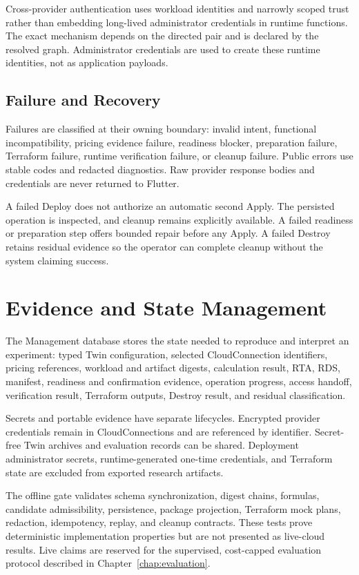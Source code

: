 Cross-provider authentication uses workload identities and narrowly scoped
trust rather than embedding long-lived administrator credentials in runtime
functions. The exact mechanism depends on the directed pair and is declared by
the resolved graph. Administrator credentials are used to create these runtime
identities, not as application payloads.

\subsection{Failure and Recovery}
\label{sec:error-handling}

Failures are classified at their owning boundary: invalid intent, functional
incompatibility, pricing evidence failure, readiness blocker, preparation
failure, Terraform failure, runtime verification failure, or cleanup failure.
Public errors use stable codes and redacted diagnostics. Raw provider response
bodies and credentials are never returned to Flutter.

A failed Deploy does not authorize an automatic second Apply. The persisted
operation is inspected, and cleanup remains explicitly available. A failed
readiness or preparation step offers bounded repair before any Apply. A failed
Destroy retains residual evidence so the operator can complete cleanup without
the system claiming success.

\section{Evidence and State Management}
\label{sec:data-flow}

The Management database stores the state needed to reproduce and interpret an
experiment: typed Twin configuration, selected CloudConnection identifiers,
pricing references, workload and artifact digests, calculation result, RTA,
RDS, manifest, readiness and confirmation evidence, operation progress,
access handoff, verification result, Terraform outputs, Destroy result, and
residual classification.

Secrets and portable evidence have separate lifecycles. Encrypted provider
credentials remain in CloudConnections and are referenced by identifier.
Secret-free Twin archives and evaluation records can be shared. Deployment
administrator secrets, runtime-generated one-time credentials, and Terraform
state are excluded from exported research artifacts.

The offline gate validates schema synchronization, digest chains, formulas,
candidate admissibility, persistence, package projection, Terraform mock
plans, redaction, idempotency, replay, and cleanup contracts. These tests prove
deterministic implementation properties but are not presented as live-cloud
results. Live claims are reserved for the supervised, cost-capped evaluation
protocol described in Chapter~\ref{chap:evaluation}.
